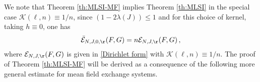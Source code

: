 \documentclass[11pt,reqno]{amsart}
\numberwithin{equation}{section}
\numberwithin{figure}{section}
\newcommand{\1}{\mathds{1}}
\newcommand{\cK}{\ensuremath{\mathcal K}}
\begin{document}
We note that Theorem \ref{th:MLSI-MF} implies Theorem \ref{th:MLSI} in the special case $\cK(\ell,n)\equiv1/n$, since $(1-2\lambda(J))\le 1$ and for this choice of kernel, taking $h\equiv 0$,  one has \[\bar{\mathcal{E}}_{N, J,0,\r}(F, G)=n\mathcal{E}_{N, J,\r}(F, G)\,,\]
where $ \mathcal{E}_{N, J,\r}(F, G)$ is given in \eqref{Dirichlet form} with $\cK(\ell,n)\equiv1/n$.
The proof of Theorem \ref{th:MLSI-MF} will be derived as a consequence of the following more general estimate for mean field exchange systems. 

  



%
%
\end{document}
